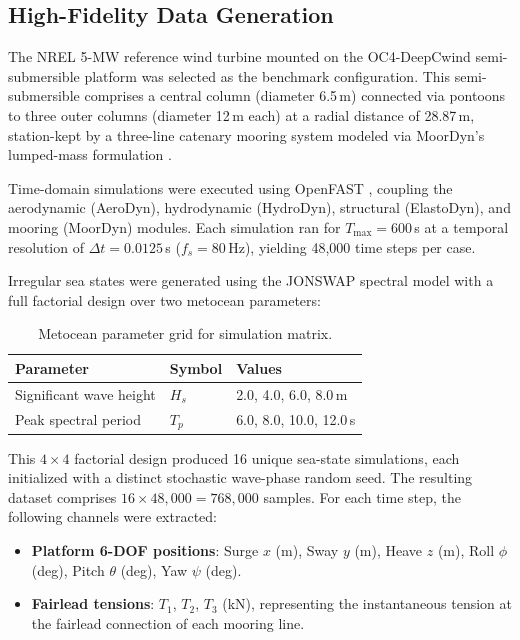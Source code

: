 \documentclass[preprint,12pt]{elsarticle}
\begin{document}
\subsection{High-Fidelity Data Generation}
\label{sec:data_generation}

The NREL 5-MW reference wind turbine \cite{jonkman2009definition} mounted on the OC4-DeepCwind semi-submersible platform \cite{robertson2014oc4} was selected as the benchmark configuration. This semi-submersible comprises a central column (diameter 6.5\,m) connected via pontoons to three outer columns (diameter 12\,m each) at a radial distance of 28.87\,m, station-kept by a three-line catenary mooring system modeled via MoorDyn's lumped-mass formulation \cite{hall2015validation}.

Time-domain simulations were executed using OpenFAST \cite{jonkman2013openfast}, coupling the aerodynamic (AeroDyn), hydrodynamic (HydroDyn), structural (ElastoDyn), and mooring (MoorDyn) modules. Each simulation ran for $T_{\text{max}} = 600$\,s at a temporal resolution of $\Delta t = 0.0125$\,s ($f_s = 80$\,Hz), yielding 48,000 time steps per case.

Irregular sea states were generated using the JONSWAP spectral model \cite{hasselmann1973measurements} with a full factorial design over two metocean parameters:

\begin{table}[htbp]
\centering
\caption{Metocean parameter grid for simulation matrix.}
\label{tab:metocean}
\begin{tabular}{@{}lll@{}}
\toprule
\textbf{Parameter} & \textbf{Symbol} & \textbf{Values} \\
\midrule
Significant wave height & $H_s$ & 2.0, 4.0, 6.0, 8.0\,m \\
Peak spectral period & $T_p$ & 6.0, 8.0, 10.0, 12.0\,s \\
\bottomrule
\end{tabular}
\end{table}

\noindent This $4 \times 4$ factorial design produced 16 unique sea-state simulations, each initialized with a distinct stochastic wave-phase random seed. The resulting dataset comprises $16 \times 48{,}000 = 768{,}000$ samples. For each time step, the following channels were extracted:

\begin{itemize}
    \item \textbf{Platform 6-DOF positions}: Surge $x$ (m), Sway $y$ (m), Heave $z$ (m), Roll $\phi$ (deg), Pitch $\theta$ (deg), Yaw $\psi$ (deg).
    \item \textbf{Fairlead tensions}: $T_1$, $T_2$, $T_3$ (kN), representing the instantaneous tension at the fairlead connection of each mooring line.
\end{itemize}
\end{document}

